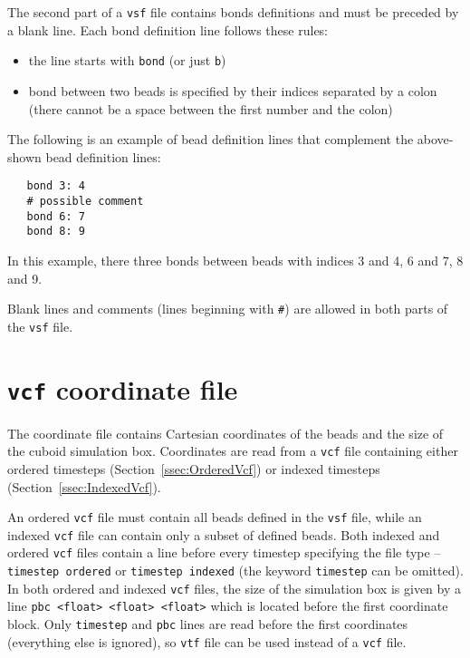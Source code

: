 The second part of a \texttt{vsf} file contains bonds definitions and must
be preceded by a blank line. Each bond definition line follows these rules:

\begin{itemize}[topsep=0pt,itemsep=0pt]
  \item the line starts with \texttt{bond} (or just \texttt{b})
  \item bond between two beads is specified by their indices separated by a
    colon (there cannot be a space between the first number and the colon)
\end{itemize}

The following is an example of bead definition lines that complement the
above-shown bead definition lines:

\begin{verbatim}
   bond 3: 4
   # possible comment
   bond 6: 7
   bond 8: 9
\end{verbatim}

In this example, there three bonds between beads with indices 3 and 4, 6
and 7, 8 and 9.

Blank lines and comments (lines beginning with \texttt{\#}) are allowed in
both parts of the \texttt{vsf} file.

\section{\texttt{vcf} coordinate file} \label{sec:CoordinateVcf}

The coordinate file contains Cartesian coordinates of the beads and the
size of the cuboid simulation box.
Coordinates are read from a \texttt{vcf} file
containing either ordered timesteps (Section~\ref{ssec:OrderedVcf}) or
indexed timesteps (Section~\ref{ssec:IndexedVcf}).

An ordered \texttt{vcf} file must contain all beads defined in the
\texttt{vsf} file, while an indexed \texttt{vcf} file can contain only a
subset of defined beads. Both indexed and ordered \texttt{vcf} files
contain a line before every timestep specifying the file type --
\texttt{timestep ordered} or \texttt{timestep indexed} (the keyword
\texttt{timestep} can be omitted).  In both ordered and indexed
\texttt{vcf} files, the size of the simulation box is given by a line
\texttt{pbc <float> <float> <float>} which is located before the first
coordinate block. Only \texttt{timestep} and \texttt{pbc} lines are read
before the first coordinates (everything else is ignored), so \texttt{vtf}
file can be used instead of a \texttt{vcf} file.

